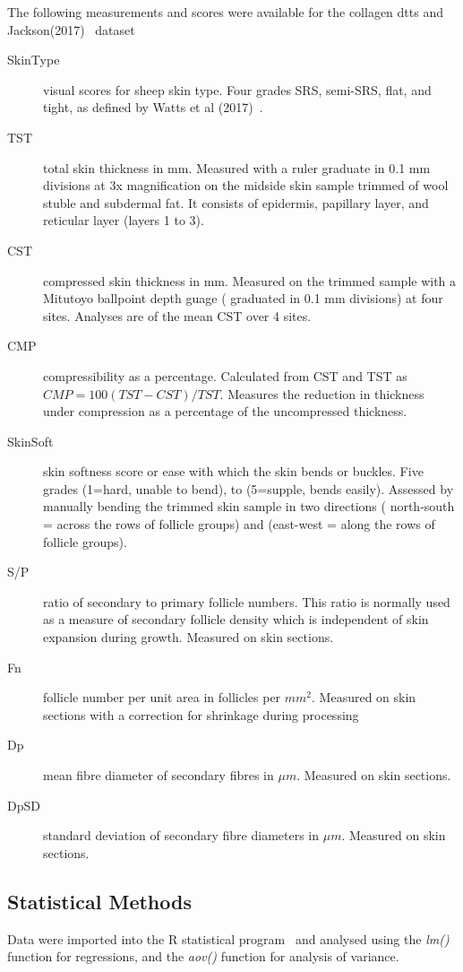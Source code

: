 \documentclass[titlepage]{article}  %
\begin{document}
The following measurements and scores were available for the collagen dtts and Jackson(2017)~\cite{watt:17b} dataset
\begin{description}
\item[SkinType] visual scores for sheep skin type. Four grades SRS, semi-SRS, flat, and tight, as defined by Watts et al (2017)~\cite{watt:17}.
\item[TST] total skin thickness in mm. Measured with a ruler graduate in 0.1 mm divisions at 3x magnification on the midside skin sample trimmed of wool stuble and subdermal fat. It consists of epidermis, papillary layer, and reticular layer (layers 1 to 3).
\item[CST] compressed skin thickness in mm. Measured on the trimmed sample with a Mitutoyo ballpoint depth guage ( graduated in 0.1 mm divisions) at four sites. Analyses are of the mean CST over 4 sites.
\item[CMP] compressibility as a percentage. Calculated from CST and TST as $CMP = 100(TST-CST)/TST$. Measures the reduction in thickness under compression as a percentage of the uncompressed thickness.
\item[SkinSoft] skin softness score or ease with which the skin bends or buckles. Five grades (1=hard, unable to bend), to (5=supple, bends easily). Assessed by manually bending the trimmed skin sample in two directions ( north-south = across the rows of follicle groups) and (east-west = along the rows of follicle groups).
\item[S/P] ratio of secondary to primary follicle numbers. This ratio is normally used as a measure of secondary follicle density which is independent of skin expansion during growth. Measured on skin sections.
\item[Fn] follicle number per unit area in follicles per $mm^{2}$. Measured on skin sections with a correction for shrinkage during processing
\item[Dp] mean fibre diameter of secondary fibres in $\mu m$. Measured on skin sections.
\item[DpSD] standard deviation of secondary fibre diameters in $\mu m$. Measured on skin sections.
\end{description}


\subsection{Statistical Methods}
Data were imported into the R statistical program~\cite{rprog:13} and analysed using the {\em lm()} function for regressions, and the {\em aov()} function for analysis of variance.
\end{document}
